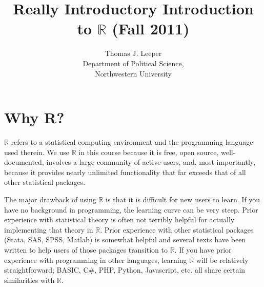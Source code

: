 \documentclass[12pt]{article}
\title{Really Introductory Introduction to $\mathbb{R}$ (Fall 2011)}
\author{Thomas J. Leeper\\
Department of Political Science,\\
Northwestern University}
\begin{document}
\maketitle


\section{Why R?}\label{sec:intro}
$\mathbb{R}$ refers to a statistical computing environment and the programming language used therein. We use $\mathbb{R}$ in this course because it is free, open source, well-documented, involves a large community of active users, and, most importantly, because it provides nearly unlimited functionality that far exceeds that of all other statistical packages.

The major drawback of using $\mathbb{R}$ is that it is difficult for new users to learn. If you have no background in programming, the learning curve can be very steep. Prior experience with statistical theory is often not terribly helpful for actually implementing that theory in $\mathbb{R}$. Prior experience with other statistical packages (Stata, SAS, SPSS, Matlab) is somewhat helpful and several texts have been written to help users of those packages transition to $\mathbb{R}$. If you have prior experience with programming in other languages, learning $\mathbb{R}$ will be relatively straightforward; BASIC, C\#, PHP, Python, Javascript, etc. all share certain similarities with $\mathbb{R}$.
\end{document}
